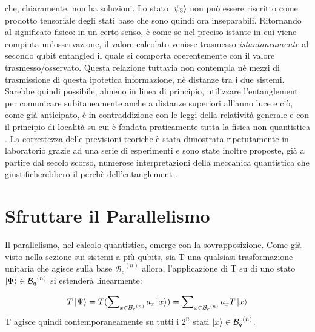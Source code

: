 \documentclass[12pt,a4paper,openright]{report}
\begin{document}
che, chiaramente, non ha soluzioni. Lo stato $\ket{\psi_3}$ non può essere riscritto come prodotto tensoriale degli stati base che sono quindi ora inseparabili.
Ritornando al significato fisico: in un certo senso, è come se nel preciso istante in cui viene compiuta un'osservazione, il valore calcolato venisse trasmesso \emph{istantaneamente} al secondo qubit entangled il quale si comporta coerentemente
con il valore trasmesso/osservato. Questa relazione tuttavia non contempla nè mezzi di trasmissione di questa ipotetica informazione, nè distanze tra i due sistemi. Sarebbe quindi possibile, almeno in linea di
principio, utilizzare l'entanglement per comunicare subitaneamente anche a distanze superiori all'anno luce e ciò, come già anticipato, è in contraddizione con le leggi della relatività generale e con il 
principio di località su cui è fondata praticamente tutta la fisica non quantistica \cite{ref9}. La correttezza delle previsioni teoriche è stata dimostrata ripetutamente in laboratorio grazie ad una serie
di esperimenti \cite{ref10} e sono state inoltre proposte, già a partire dal secolo scorso, numerose interpretazioni della meccanica quantistica che giustificherebbero il perchè dell'entanglement \cite{ref11}.

\section{Sfruttare il Parallelismo}

Il parallelismo, nel calcolo quantistico, emerge con la sovrapposizione. Come già visto nella sezione sui sistemi a più qubits, sia T una qualsiasi trasformazione unitaria che agisce sulla base ${\mathcal{B}_c}^{(n)}$
allora, l'applicazione di T su di uno stato $\ket{\Psi}\in{{\mathcal{B}_q}^{(n)}}$ si estenderà linearmente:

\[
    T\ket{\Psi} = T(\sum\nolimits_{x \in {\mathcal{B}_c}^{(n)}} a_x \ket{x}) = \sum\nolimits_{x \in {\mathcal{B}_c}^{(n)}} a_x T\ket{x}
\]
T agisce quindi contemporaneamente su tutti i $2^n$ stati $\ket{x}\in{{\mathcal{B}_q}^{(n)}}$.

\par
\end{document}
